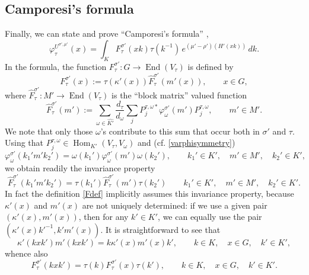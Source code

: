 \documentclass[11pt,oneside]{amsart}
\numberwithin{equation}{section}
\theoremstyle{remark}
\theoremstyle{plain}
\DeclareMathOperator{\Hom}{Hom}
\DeclareMathOperator{\End}{End}
\begin{document}
\subsection{Camporesi's formula}
Finally, we can state and prove ``Camporesi's formula'' \cite[(4.8)--(4.9)]{C},
\begin{equation}\label{Eis}
\varphi_\tau^{U^{\sigma',\mu'}}(x)=\int_K F_\tau^{\sigma'}(xk)\tau(k^{-1})\,e^{(\mu'-\rho')(H'(xk))}\,dk.
\end{equation}
In the formula, the function $F_\tau^{\sigma'}:G\to\End(V_\tau)$ is defined by
\begin{equation}\label{Fdef}
F_\tau^{\sigma'}(x):=\tau(\kappa'(x))\hat F_\tau^{\sigma'}(m'(x)),\qquad x\in G,
\end{equation}
where $\hat F_\tau^{\sigma'}:M'\to\End(V_\tau)$ is the ``block matrix'' valued function
\begin{equation}\label{Fdef2}
\hat F_\tau^{\sigma'}(m'):=\sum_{\omega\in\widehat{K'}}\frac{d_\tau}{d_\omega}
\sum_jP_j^{\tau,\omega\ast}\varphi_{\omega}^{\sigma'}(m')P_j^{\tau,\omega},\qquad m'\in M'.
\end{equation}
We note that only those $\omega$'s contribute to this sum that occur both in $\sigma'$ and $\tau$. Using that $P_j^{\tau,\omega}\in\Hom_{K'}(V_\tau,V_\omega)$ and (cf. \eqref{varphisymmetry})
\[\varphi_{\omega}^{\sigma'}(k_1'm'k_2')=\omega(k_1')\varphi_{\omega}^{\sigma'}(m')\omega(k_2'),
\qquad k_1'\in K',\quad m'\in M',\quad k_2'\in K',\]
we obtain readily the invariance property
\[\hat F_\tau^{\sigma'}(k_1'm'k_2')=\tau(k_1')\hat F_\tau^{\sigma'}(m')\tau(k_2')
\qquad k_1'\in K',\quad m'\in M',\quad k_2'\in K'.\]
In fact the definition \eqref{Fdef} implicitly assumes this invariance property, because $\kappa'(x)$ and $m'(x)$ are not uniquely determined: if we use a given pair $(\kappa'(x),m'(x))$, then for any $k'\in K'$, we can equally use the pair $(\kappa'(x)k'^{-1},k'm'(x))$. It is straightforward to see that
\[\kappa'(kxk')m'(kxk')=k\kappa'(x)m'(x)k',\qquad k\in K,\quad x\in G,\quad k'\in K',\]
whence also
\begin{equation}\label{inv}
F_\tau^{\sigma'}(kxk')=\tau(k)F_\tau^{\sigma'}(x)\tau(k'),\qquad k\in K,\quad x\in G,\quad k'\in K'.
\end{equation}
\end{document}

